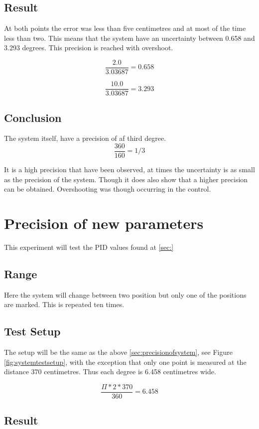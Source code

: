 \subsection{Result}

At both points the error was less than five centimetres and at most of the time less than two. This means that the system have an uncertainty between 0.658 and 3.293 degrees. This precision is reached with overshoot.

\[ \frac{2.0}{3.03687} = 0.658 \]

\[ \frac{10.0}{3.03687} = 3.293 \]

\subsection{Conclusion}

The system itself, have a precision of af third degree.
\[ \frac{360}{160} = 1/3 \]

It is a high precision that have been observed, at times the uncertainty is as small as the precision of the system. Though it does also show that a higher precision can be obtained. Overshooting was though occurring in the control.

\section{Precision of new parameters}\label{sec:precisionofsystem2}

This experiment will test the PID values found at \ref{sec:}

\subsection{Range}

Here the system will change between two position but only one of the positions are marked. This is repeated ten times.

\subsection{Test Setup}

The setup will be the same as the above \ref{sec:precisionofsystem}, see Figure \ref{fig:systemtestsetup}, with the exception that only one point is measured at the distance 370 centimetres. Thus each degree is 6.458 centimetres wide.

\[ \frac{\Pi*2*370}{360} = 6.458 \]

\subsection{Result}

